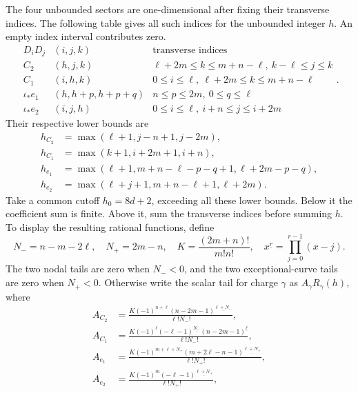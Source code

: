 The four unbounded sectors are one-dimensional after fixing their
transverse indices. The following table gives all such indices for
the unbounded integer $h$.
An empty index interval contributes zero.
\begingroup\setlength{\arraycolsep}{3pt}
\begin{equation}
 \begin{array}{c|c|c}
 D_iD_j&(i,j,k)&\text{transverse indices}\\\hline
 C_2&(h,j,k)&\ell+2m\leq k\leq m+n-\ell,
                  \ k-\ell\leq j\leq k\\
 C_1&(i,h,k)&0\leq i\leq\ell,
                  \ \ell+2m\leq k\leq m+n-\ell\\
 \iota_*e_1&(h,h+p,h+p+q)&n\leq p\leq2m,
                  \ 0\leq q\leq\ell\\
 \iota_*e_2&(i,j,h)&0\leq i\leq\ell,
                  \ i+n\leq j\leq i+2m
 \end{array}.
 \label{eq:x9-magnetic-tail-lines}
\end{equation}
\endgroup
Their respective lower bounds are
\begin{equation}
 \begin{aligned}
 h_{C_2}&=\max(\ell+1,j-n+1,j-2m),\\
 h_{C_1}&=\max(k+1,i+2m+1,i+n),\\
 h_{e_1}&=\max(\ell+1,m+n-\ell-p-q+1,\ell+2m-p-q),\\
 h_{e_2}&=\max(\ell+j+1,m+n-\ell+1,\ell+2m).
 \end{aligned}
 \label{eq:x9-magnetic-tail-lower-bounds}
\end{equation}
Take a common cutoff $h_0=8d+2$, exceeding all these lower bounds.
Below it the coefficient sum is finite. Above it, sum the
transverse indices before summing $h$. To display the resulting
rational functions, define
\begin{equation}
 N_-=n-m-2\ell,\quad N_+=2m-n,\quad
 K=\frac{(2m+n)!}{m!n!},\quad
 x^{\underline r}=\prod_{j=0}^{r-1}(x-j).
 \label{eq:x9-magnetic-tail-notation}
\end{equation}
The two nodal tails are zero when $N_-<0$, and the two
exceptional-curve tails are zero when $N_+<0$. Otherwise write
the scalar tail for charge $\gamma$ as $A_\gamma R_\gamma(h)$,
where
\begin{equation}
 \begin{aligned}
 A_{C_2}&=\frac{K(-1)^{n+\ell}
             (n-2m-1)^{\underline{\ell+N_-}}}{\ell!N_-!},\\
 A_{C_1}&=\frac{K(-1)^\ell(-\ell-1)^{\underline{N_-}}
             (n-2m-1)^{\underline\ell}}{\ell!N_-!},\\
 A_{e_1}&=\frac{K(-1)^{m+\ell+N_+}
             (m+2\ell-n-1)^{\underline{\ell+N_+}}}{\ell!N_+!},\\
 A_{e_2}&=\frac{K(-1)^m
             (-\ell-1)^{\underline{\ell+N_+}}}{\ell!N_+!},
 \end{aligned}
 \label{eq:x9-magnetic-tail-amplitudes}
\end{equation}
